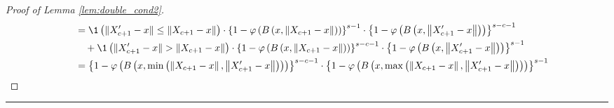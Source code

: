\begin{proof}[Proof of Lemma \ref{lem:double_cond2}]
\begin{equation}
\begin{aligned}
            & \quad = \1\left(\|X_{c+1}^{\prime} - x\| \leq \|X_{c+1} - x\|\right)
            \cdot \left\{1-\varphi\left(B\left(x,\left\|X_{c+1} - x\right\|\right)\right)\right\}^{s-1}
            \cdot \left\{1-\varphi\left(B\left(x,\left\|X_{c+1}^{\prime}-x\right\|\right)\right)\right\}^{s-c-1}\\
            & \quad \quad + \1\left(\|X_{c+1}^{\prime} - x\| > \|X_{c+1} - x\|\right)
            \cdot \left\{1-\varphi\left(B\left(x,\left\|X_{c+1} - x\right\|\right)\right)\right\}^{s-c-1}
            \cdot \left\{1-\varphi\left(B\left(x,\left\|X_{c+1}^{\prime}-x\right\|\right)\right)\right\}^{s-1}\\
            & \quad = \left\{1-\varphi\left(B\left(x, \min\left(\left\|X_{c+1} - x\right\|, \left\|X_{c+1}^{\prime}-x\right\|\right)\right)\right)\right\}^{s-c-1}
            \cdot \left\{1-\varphi\left(B\left(x,\max\left(\left\|X_{c+1} - x\right\|, \left\|X_{c+1}^{\prime}-x\right\|\right)\right)\right)\right\}^{s-1}
        \end{aligned}
    \end{equation}
\end{proof}

\hrule

